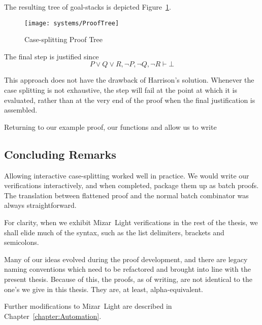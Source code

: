 The resulting tree of goal-stacks is depicted Figure~\ref{fig:CaseProofTree}. 

\begin{figure}
\begin{center}
\texttt{[image: systems/ProofTree]}
\end{center}
\caption{Case-splitting Proof Tree}
\label{fig:CaseProofTree}
\end{figure}

The final  step is justified since 
\begin{displaymath} 
P \vee Q \vee R, \neg P, \neg Q, \neg R \vdash \bot
\end{displaymath}

This approach does not have the drawback of Harrison's solution. Whenever the case splitting is not exhaustive, the  step will fail at the point at which it is evaluated, rather than at the very end of the proof when the final justification is assembled. 

Returning to our example proof, our functions  and  allow us to write

\vspace{0.5cm}
\begin{minipage}{\linewidth}
  \footnotesize






\end{minipage}
\vspace{0.5cm}

\subsection{Concluding Remarks}
Allowing interactive case-splitting worked well in practice. We would write our verifications interactively, and when completed, package them up as batch proofs. The translation between flattened proof and the normal batch  combinator was always straightforward.

For clarity, when we exhibit Mizar~Light verifications in the rest of the thesis, we shall elide much of the syntax, such as the list delimiters, brackets and semicolons. 

Many of our ideas evolved during the proof development, and there are legacy naming conventions which need to be refactored and brought into line with the present thesis. Because of this, the proofs, as of writing, are not identical to the one's we give in this thesis. They are, at least, alpha-equivalent.

Further modifications to Mizar~Light are described in Chapter~\ref{chapter:Automation}.

